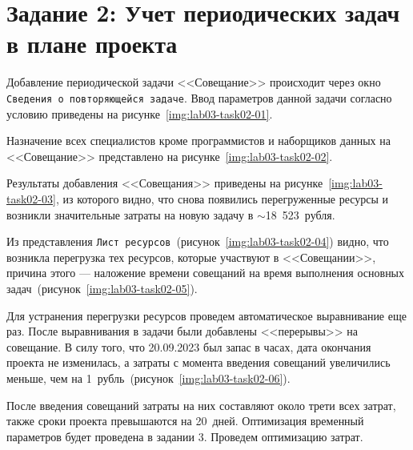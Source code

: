 \section{Задание 2: Учет периодических задач в плане проекта}

Добавление периодической задачи <<Совещание>> происходит через окно
\texttt{Сведения о повторяющейся задаче}. Ввод параметров данной задачи согласно
условию приведены на рисунке~\ref{img:lab03-task02-01}.


Назначение всех специалистов кроме программистов и наборщиков данных на
<<Совещание>> представлено на рисунке~\ref{img:lab03-task02-02}.


Результаты добавления <<Совещания>> приведены на
рисунке~\ref{img:lab03-task02-03}, из которого видно, что снова появились
перегруженные ресурсы и возникли значительные затраты на новую задачу в
$\sim$18~523~рубля.


Из представления \texttt{Лист ресурсов}~(рисунок~\ref{img:lab03-task02-04})
видно, что возникла перегрузка тех ресурсов, которые участвуют в <<Совещании>>,
причина этого --- наложение времени совещаний на время выполнения основных
задач~(рисунок~\ref{img:lab03-task02-05}).



Для устранения перегрузки ресурсов проведем автоматическое выравнивание еще
раз.  После выравнивания в задачи были добавлены <<перерывы>> на совещание. В
силу того, что 20.09.2023 был запас в часах, дата окончания проекта не
изменилась, а затраты с момента введения совещаний увеличились меньше, чем на
1~рубль~(рисунок~\ref{img:lab03-task02-06}).


После введения совещаний затраты на них составляют около трети всех затрат,
также сроки проекта превышаются на 20~дней. Оптимизация временный параметров
будет проведена в задании 3. Проведем оптимизацию затрат.

